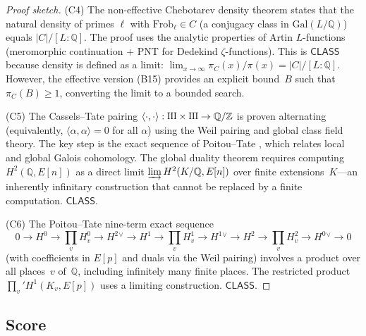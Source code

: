 \documentclass[11pt]{article}
\theoremstyle{plain}
\theoremstyle{definition}
\theoremstyle{remark}
\newcommand{\Z}{\mathbb{Z}}
\newcommand{\Q}{\mathbb{Q}}
\newcommand{\Gal}{\mathrm{Gal}}
\newcommand{\Sha}{\text{\raisebox{0.05ex}{\scalebox{0.85}[1]{III}}}}
\newcommand{\Frob}{\mathrm{Frob}}
\newcommand{\CLASS}{\ensuremath{\mathsf{CLASS}}}
\begin{document}
\begin{proof}[Proof sketch]
(C4) The non-effective Chebotarev density theorem states that the natural density of primes $\ell$ with $\Frob_\ell \in C$ (a conjugacy class in $\Gal(L/\Q)$) equals $|C|/[L:\Q]$. The proof uses the analytic properties of Artin $L$-functions (meromorphic continuation + PNT for Dedekind $\zeta$-functions). This is $\CLASS$ because density is defined as a limit: $\lim_{x \to \infty} \pi_C(x)/\pi(x) = |C|/[L:\Q]$. However, the effective version (B15) provides an explicit bound~$B$ such that $\pi_C(B) \geq 1$, converting the limit to a bounded search.

(C5) The Cassels--Tate pairing $\langle \cdot, \cdot \rangle: \Sha \times \Sha \to \Q/\Z$ is proven alternating (equivalently, $\langle \alpha, \alpha \rangle = 0$ for all $\alpha$) using the Weil pairing and global class field theory. The key step is the exact sequence of Poitou--Tate \cite{poitou-tate}, which relates local and global Galois cohomology. The global duality theorem requires computing $H^2(\Q, E[n])$ as a direct limit $\varinjlim H^2(K/\Q, E[n])$ over finite extensions~$K$---an inherently infinitary construction that cannot be replaced by a finite computation. $\CLASS$.

(C6) The Poitou--Tate nine-term exact sequence
\[
0 \to H^0 \to \textstyle\prod_v H^0_v \to H^2{}^\vee \to H^1 \to \textstyle\prod_v H^1_v \to H^1{}^\vee \to H^2 \to \textstyle\prod_v H^2_v \to H^0{}^\vee \to 0
\]
(with coefficients in $E[p]$ and duals via the Weil pairing) involves a product over all places~$v$ of~$\Q$, including infinitely many finite places. The restricted product $\prod_v' H^1(K_v, E[p])$ uses a limiting construction. $\CLASS$.
\end{proof}

\subsection{Score}
\end{document}
